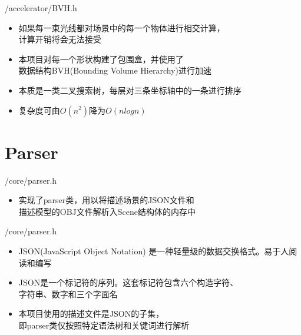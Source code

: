 \documentclass{beamer}
\begin{document}
\begin{frame} {/accelerator/BVH.h}
\begin{itemize}
\item 如果每一束光线都对场景中的每一个物体进行相交计算，\\ 计算开销将会无法接受
\item 本项目对每一个形状构建了包围盒，并使用了\\数据结构BVH(Bounding Volume Hierarchy)进行加速
\item 本质是一类二叉搜索树，每层对三条坐标轴中的一条进行排序
\item 复杂度可由$O(n^2)$降为$O(n log n)$
\end{itemize}
\end{frame}

\section{Parser}
\begin{frame} {/core/parser.h}
\begin{itemize}
\item 实现了parser类，用以将描述场景的JSON文件和 \\ 描述模型的OBJ文件解析入Scene结构体的内存中
\end{itemize}
\end{frame}

\begin{frame} {/core/parser.h}
\begin{itemize}
\item JSON(JavaScript Object Notation) 是一种轻量级的数据交换格式。易于人阅读和编写
\item JSON是一个标记符的序列。这套标记符包含六个构造字符、\\ 字符串、数字和三个字面名
\item 本项目使用的描述文件是JSON的子集，\\ 即parser类仅按照特定语法树和关键词进行解析
\end{itemize}
\end{frame}
\end{document}
